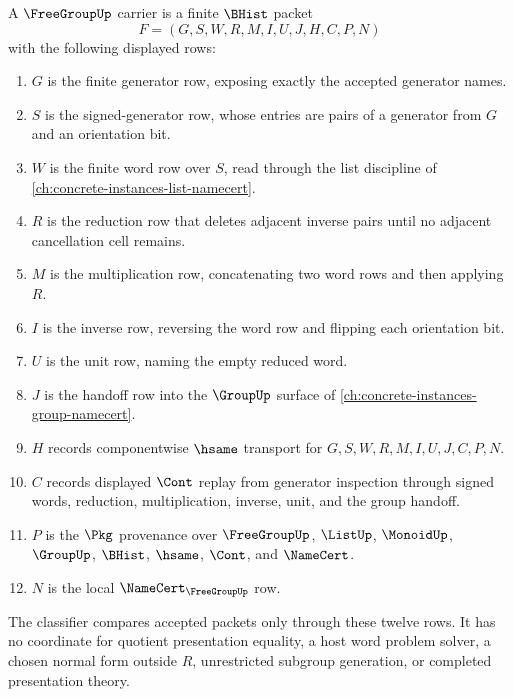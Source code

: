 \begin{definition}
\label{def:free-group-carrier}
A $\FreeGroupUp$ carrier is a finite $\BHist$ packet
$$
F=(G,S,W,R,M,I,U,J,H,C,P,N)
$$
with the following displayed rows:
\begin{enumerate}
\item $G$ is the finite generator row, exposing exactly the accepted generator names.
\item $S$ is the signed-generator row, whose entries are pairs of a generator from $G$ and an orientation bit.
\item $W$ is the finite word row over $S$, read through the list discipline of \autoref{ch:concrete-instances-list-namecert}.
\item $R$ is the reduction row that deletes adjacent inverse pairs until no adjacent cancellation cell remains.
\item $M$ is the multiplication row, concatenating two word rows and then applying $R$.
\item $I$ is the inverse row, reversing the word row and flipping each orientation bit.
\item $U$ is the unit row, naming the empty reduced word.
\item $J$ is the handoff row into the $\GroupUp$ surface of \autoref{ch:concrete-instances-group-namecert}.
\item $H$ records componentwise $\hsame$ transport for $G,S,W,R,M,I,U,J,C,P,N$.
\item $C$ records displayed $\Cont$ replay from generator inspection through signed words, reduction, multiplication, inverse, unit, and the group handoff.
\item $P$ is the $\Pkg$ provenance over $\FreeGroupUp$, $\ListUp$, $\MonoidUp$, $\GroupUp$, $\BHist$, $\hsame$, $\Cont$, and $\NameCert$.
\item $N$ is the local $\NameCert_{\FreeGroupUp}$ row.
\end{enumerate}
The classifier compares accepted packets only through these twelve rows. It has no coordinate for quotient presentation equality, a host word problem solver, a chosen normal form outside $R$, unrestricted subgroup generation, or completed presentation theory.
\end{definition}

